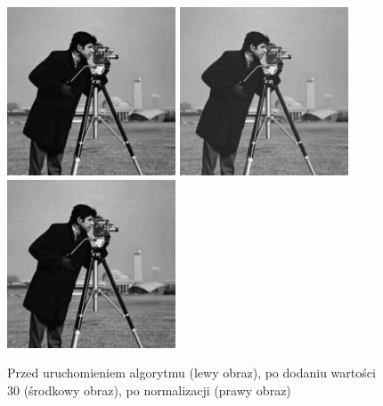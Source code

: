 \documentclass[a4paper,12pt]{book}
\begin{document}
\begin{figure}[H]
	\caption{Przed uruchomieniem algorytmu (lewy obraz), po dodaniu wartości 30 (środkowy obraz), po normalizacji (prawy obraz)}
	\includegraphics[width=5cm, height=5cm]{man-unmodified.jpg}
	\includegraphics[width=5cm, height=5cm]{2/sum-gray-const-30-2.png}
	\includegraphics[width=5cm, height=5cm]{2/sum-gray-const-30-norm-2.png}
\end{figure}
\end{document}
